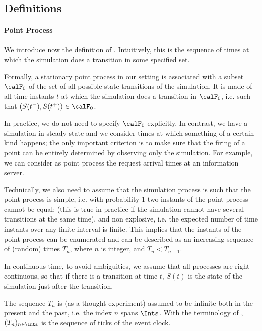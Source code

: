 \subsection{Definitions}
\label{sec-point-process}
\paragraph*{Point Process}
We introduce now the definition of .
Intuitively, this is the sequence of times at which the simulation
does a transition in some specified set.

Formally, a stationary point process in our setting is associated
with a subset $\calF_0$ of the set of all possible state transitions
of the simulation. It is made of all time instants $t$ at which the
simulation does a transition in $\calF_0$, i.e. such that $(S(t^-),
S(t^+))\in \calF_0$.

In practice, we do not need to specify $\calF_0$ explicitly. In
contrast, we have a simulation in steady state and we consider times
at which something of a certain kind happens; the only important
criterion is to make sure that the firing of a point can be entirely
determined by observing only the simulation. For example, we can
consider as point process the request arrival times at an
information server.

Technically, we also need to assume that the simulation process
is such that the point process is simple, i.e. with probability
1 two instants of the point process cannot be equal; (this is
true in practice if the simulation cannot have several
transitions at the same time), and non explosive, i.e. the
expected number of time instants over any finite interval is
finite. This implies that the instants of the point process can
be enumerated and can be described as an increasing sequence of
(random) times $T_n$, where $n$ is integer, and $T_n <
T_{n+1}$.

In continuous time, to avoid ambiguities, we assume that all
processes are right continuous, so that if there is a transition at
time $t$, $S(t)$ is the state of the simulation just after the
transition.

The sequence $T_n$ is (as a thought experiment) assumed to be
infinite both in the present and the past, i.e. the index $n$ spans
$\Ints$. With the terminology of , $(T_n)_{n
\in \Ints}$ is the sequence of ticks of the event clock.

